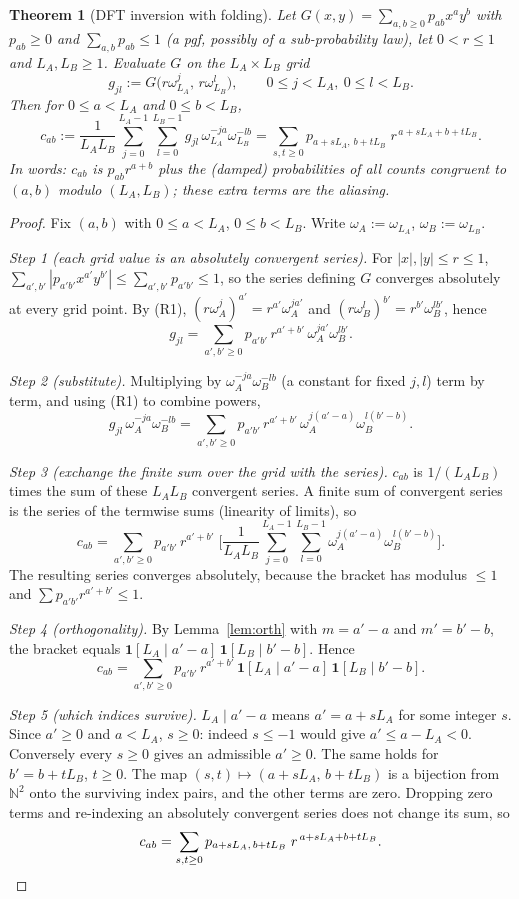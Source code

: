\documentclass[11pt]{article}
\newtheorem{theorem}{Theorem}[section]
\theoremstyle{definition}
\theoremstyle{remark}
\begin{document}
\begin{theorem}[DFT inversion with folding]\label{thm:fold}
Let $G(x,y)=\sum_{a,b\ge0}p_{ab}x^ay^b$ with $p_{ab}\ge0$ and $\sum_{a,b}p_{ab}\le1$ (a pgf, possibly of a sub-probability law), let $0<r\le1$ and $L_A,L_B\ge1$. Evaluate $G$ on the $L_A\times L_B$ grid
\[
g_{jl}:=G\big(r\omega_{L_A}^j,\,r\omega_{L_B}^l\big),\qquad 0\le j<L_A,\ 0\le l<L_B .
\]
Then for $0\le a<L_A$ and $0\le b<L_B$,
\[
c_{ab}:=\frac1{L_AL_B}\sum_{j=0}^{L_A-1}\sum_{l=0}^{L_B-1}g_{jl}\,\omega_{L_A}^{-ja}\omega_{L_B}^{-lb}
=\sum_{s,t\ge0}p_{a+sL_A,\,b+tL_B}\;r^{\,a+sL_A+b+tL_B}.
\]
In words: $c_{ab}$ is $p_{ab}r^{a+b}$ plus the (damped) probabilities of all counts congruent to $(a,b)$ modulo $(L_A,L_B)$; these extra terms are the \emph{aliasing}.
\end{theorem}
\begin{proof}
Fix $(a,b)$ with $0\le a<L_A$, $0\le b<L_B$. Write $\omega_A:=\omega_{L_A}$, $\omega_B:=\omega_{L_B}$.

\emph{Step 1 (each grid value is an absolutely convergent series).} For $|x|,|y|\le r\le1$, $\sum_{a',b'}|p_{a'b'}x^{a'}y^{b'}|\le\sum_{a',b'}p_{a'b'}\le1$, so the series defining $G$ converges absolutely at every grid point. By (R1), $(r\omega_A^j)^{a'}=r^{a'}\omega_A^{ja'}$ and $(r\omega_B^l)^{b'}=r^{b'}\omega_B^{lb'}$, hence
\[
g_{jl}=\sum_{a',b'\ge0}p_{a'b'}\,r^{a'+b'}\,\omega_A^{ja'}\omega_B^{lb'} .
\]

\emph{Step 2 (substitute).} Multiplying by $\omega_A^{-ja}\omega_B^{-lb}$ (a constant for fixed $j,l$) term by term, and using (R1) to combine powers,
\[
g_{jl}\,\omega_A^{-ja}\omega_B^{-lb}=\sum_{a',b'\ge0}p_{a'b'}\,r^{a'+b'}\,\omega_A^{j(a'-a)}\omega_B^{l(b'-b)} .
\]

\emph{Step 3 (exchange the finite sum over the grid with the series).} $c_{ab}$ is $1/(L_AL_B)$ times the sum of these $L_AL_B$ convergent series. A finite sum of convergent series is the series of the termwise sums (linearity of limits), so
\[
c_{ab}=\sum_{a',b'\ge0}p_{a'b'}\,r^{a'+b'}\;\Bigg[\frac1{L_AL_B}\sum_{j=0}^{L_A-1}\sum_{l=0}^{L_B-1}\omega_A^{j(a'-a)}\omega_B^{l(b'-b)}\Bigg].
\]
The resulting series converges absolutely, because the bracket has modulus $\le1$ and $\sum p_{a'b'}r^{a'+b'}\le1$.

\emph{Step 4 (orthogonality).} By Lemma~\ref{lem:orth} with $m=a'-a$ and $m'=b'-b$, the bracket equals $\mathbf 1[L_A\mid a'-a]\,\mathbf 1[L_B\mid b'-b]$. Hence
\[
c_{ab}=\sum_{a',b'\ge0}p_{a'b'}\,r^{a'+b'}\,\mathbf 1[L_A\mid a'-a]\,\mathbf 1[L_B\mid b'-b] .
\]

\emph{Step 5 (which indices survive).} $L_A\mid a'-a$ means $a'=a+sL_A$ for some integer $s$. Since $a'\ge0$ and $a<L_A$, $s\ge0$: indeed $s\le-1$ would give $a'\le a-L_A<0$. Conversely every $s\ge0$ gives an admissible $a'\ge0$. The same holds for $b'=b+tL_B$, $t\ge0$. The map $(s,t)\mapsto(a+sL_A,\,b+tL_B)$ is a bijection from $\mathbb N^2$ onto the surviving index pairs, and the other terms are zero. Dropping zero terms and re-indexing an absolutely convergent series does not change its sum, so
\[
c_{ab}=\sum_{s,t\ge0}p_{a+sL_A,\,b+tL_B}\;r^{\,a+sL_A+b+tL_B}.\qedhere
\]
\end{proof}
\end{document}
